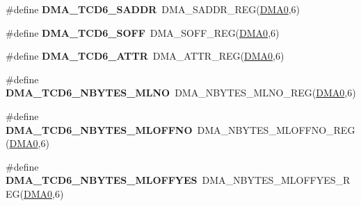 \begin{DoxyCompactItemize}
\item 
\#define {\bfseries D\+M\+A\+\_\+\+T\+C\+D6\+\_\+\+S\+A\+D\+DR}~D\+M\+A\+\_\+\+S\+A\+D\+D\+R\+\_\+\+R\+EG(\hyperlink{group__DMA__Peripheral__Access__Layer_ga4103044f9ca209772f513dc694513ffb}{D\+M\+A0},6)\hypertarget{group__DMA__Register__Accessor__Macros_ga0f41c78fcfe67fb12a25ecf7df8f9127}{}\label{group__DMA__Register__Accessor__Macros_ga0f41c78fcfe67fb12a25ecf7df8f9127}

\item 
\#define {\bfseries D\+M\+A\+\_\+\+T\+C\+D6\+\_\+\+S\+O\+FF}~D\+M\+A\+\_\+\+S\+O\+F\+F\+\_\+\+R\+EG(\hyperlink{group__DMA__Peripheral__Access__Layer_ga4103044f9ca209772f513dc694513ffb}{D\+M\+A0},6)\hypertarget{group__DMA__Register__Accessor__Macros_gac85de51a9a8986d8268f7f1f27bfb00f}{}\label{group__DMA__Register__Accessor__Macros_gac85de51a9a8986d8268f7f1f27bfb00f}

\item 
\#define {\bfseries D\+M\+A\+\_\+\+T\+C\+D6\+\_\+\+A\+T\+TR}~D\+M\+A\+\_\+\+A\+T\+T\+R\+\_\+\+R\+EG(\hyperlink{group__DMA__Peripheral__Access__Layer_ga4103044f9ca209772f513dc694513ffb}{D\+M\+A0},6)\hypertarget{group__DMA__Register__Accessor__Macros_ga0bce2367a1fe49658e389384bede7937}{}\label{group__DMA__Register__Accessor__Macros_ga0bce2367a1fe49658e389384bede7937}

\item 
\#define {\bfseries D\+M\+A\+\_\+\+T\+C\+D6\+\_\+\+N\+B\+Y\+T\+E\+S\+\_\+\+M\+L\+NO}~D\+M\+A\+\_\+\+N\+B\+Y\+T\+E\+S\+\_\+\+M\+L\+N\+O\+\_\+\+R\+EG(\hyperlink{group__DMA__Peripheral__Access__Layer_ga4103044f9ca209772f513dc694513ffb}{D\+M\+A0},6)\hypertarget{group__DMA__Register__Accessor__Macros_ga5df3e27b1d307f3799a0518af5e77b5d}{}\label{group__DMA__Register__Accessor__Macros_ga5df3e27b1d307f3799a0518af5e77b5d}

\item 
\#define {\bfseries D\+M\+A\+\_\+\+T\+C\+D6\+\_\+\+N\+B\+Y\+T\+E\+S\+\_\+\+M\+L\+O\+F\+F\+NO}~D\+M\+A\+\_\+\+N\+B\+Y\+T\+E\+S\+\_\+\+M\+L\+O\+F\+F\+N\+O\+\_\+\+R\+EG(\hyperlink{group__DMA__Peripheral__Access__Layer_ga4103044f9ca209772f513dc694513ffb}{D\+M\+A0},6)\hypertarget{group__DMA__Register__Accessor__Macros_ga665fe503506ca6d695a7b3520579678f}{}\label{group__DMA__Register__Accessor__Macros_ga665fe503506ca6d695a7b3520579678f}

\item 
\#define {\bfseries D\+M\+A\+\_\+\+T\+C\+D6\+\_\+\+N\+B\+Y\+T\+E\+S\+\_\+\+M\+L\+O\+F\+F\+Y\+ES}~D\+M\+A\+\_\+\+N\+B\+Y\+T\+E\+S\+\_\+\+M\+L\+O\+F\+F\+Y\+E\+S\+\_\+\+R\+EG(\hyperlink{group__DMA__Peripheral__Access__Layer_ga4103044f9ca209772f513dc694513ffb}{D\+M\+A0},6)\hypertarget{group__DMA__Register__Accessor__Macros_ga18f055c822e10a2c8cfdcddd8bdc61bc}{}\label{group__DMA__Register__Accessor__Macros_ga18f055c822e10a2c8cfdcddd8bdc61bc}


\end{DoxyCompactItemize}
